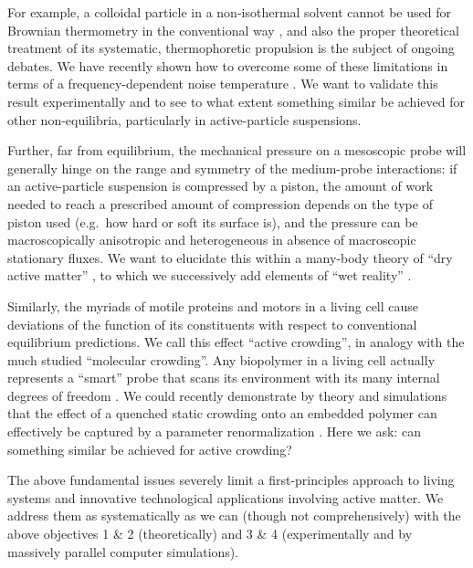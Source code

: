 \begin{workpackage}
\begin{wpdescription}
For example, a colloidal particle in a non-isothermal solvent cannot be used for Brownian thermometry 
in the conventional way \cite{rings-etal:2010,kroy:2014}, and also the proper theoretical 
treatment of its systematic, thermophoretic propulsion is the subject of ongoing debates.
%
We have recently shown how to overcome some of these limitations in terms of a frequency-dependent noise 
temperature \cite{falasco-etal:2014}.
%
We want to validate this result experimentally and to see to what extent something similar be achieved for other 
non-equilibria, particularly in active-particle suspensions.

Further, far from equilibrium, the mechanical pressure on a mesoscopic probe will generally hinge on the range and 
symmetry of the medium-probe interactions: if an active-particle suspension is compressed by a piston, the
amount of work needed to reach a prescribed amount of compression depends on the type of
piston used (e.g.\ how hard or soft its surface is), and the pressure can be macroscopically
anisotropic and heterogeneous in absence of macroscopic stationary fluxes. 
%
We want to elucidate this within a many-body theory of ``dry active matter'' \cite{marchetti-etal:2013}, 
to which we successively add elements of ``wet reality'' \cite{zoettl-stark:2014}.

Similarly, the myriads of motile proteins and motors in a living cell cause deviations of the function
of its constituents with respect to conventional equilibrium predictions.  We call this
effect ``active crowding'', in analogy with the much studied ``molecular crowding''. 
%
Any biopolymer in a living cell actually represents a ``smart'' probe that scans its environment with its many 
internal degrees of freedom \cite{otto-etal:2013}.
%
We could recently demonstrate by theory and simulations that the effect of a quenched static crowding onto an embedded
polymer can effectively be captured by a parameter renormalization \cite{schoebl-etal:2014}.  
%
Here we ask: can something similar be achieved for active crowding?

The above fundamental issues severely limit a first-principles approach to living systems and
innovative technological applications involving active matter.
%
We address them as systematically as we can (though not comprehensively) with the above
objectives 1 \& 2 (theoretically) and 3 \& 4 (experimentally and by massively parallel
computer simulations).

\end{wpdescription}


\end{workpackage}
